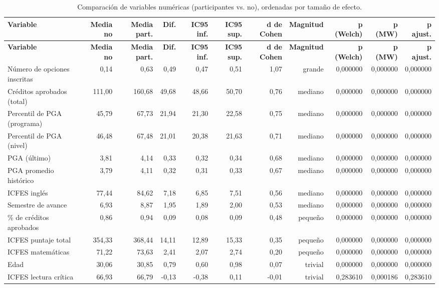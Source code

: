 \begin{longtable}{lrrrrrrrrrr}
\caption{Comparación de variables numéricas (participantes vs. no), ordenadas por tamaño de efecto.}\label{tab:comparativo-num}\\
\toprule
\textbf{Variable} & \textbf{Media no} & \textbf{Media part.} & \textbf{Dif.} & \textbf{IC95 inf.} & \textbf{IC95 sup.} & \textbf{d de Cohen} & \textbf{Magnitud} & \textbf{p (Welch)} & \textbf{p (MW)} & \textbf{p ajust.} \\
\midrule
\endfirsthead
\toprule \textbf{Variable} & \textbf{Media no} & \textbf{Media part.} & \textbf{Dif.} & \textbf{IC95 inf.} & \textbf{IC95 sup.} & \textbf{d de Cohen} & \textbf{Magnitud} & \textbf{p (Welch)} & \textbf{p (MW)} & \textbf{p ajust.} \\
\midrule
\endhead
\bottomrule
\endfoot
Número de opciones inscritas & 0,14 & 0,63 & 0,49 & 0,47 & 0,51 & 1,07 & grande & 0,000000 & 0,000000 & 0,000000 \\
Créditos aprobados (total) & 111,00 & 160,68 & 49,68 & 48,66 & 50,70 & 0,76 & mediano & 0,000000 & 0,000000 & 0,000000 \\
Percentil de PGA (programa) & 45,79 & 67,73 & 21,94 & 21,30 & 22,58 & 0,75 & mediano & 0,000000 & 0,000000 & 0,000000 \\
Percentil de PGA (nivel) & 46,48 & 67,48 & 21,01 & 20,38 & 21,63 & 0,71 & mediano & 0,000000 & 0,000000 & 0,000000 \\
PGA (último) & 3,81 & 4,14 & 0,33 & 0,32 & 0,34 & 0,68 & mediano & 0,000000 & 0,000000 & 0,000000 \\
PGA promedio histórico & 3,79 & 4,11 & 0,32 & 0,31 & 0,33 & 0,67 & mediano & 0,000000 & 0,000000 & 0,000000 \\
ICFES inglés & 77,44 & 84,62 & 7,18 & 6,85 & 7,51 & 0,56 & mediano & 0,000000 & 0,000000 & 0,000000 \\
Semestre de avance & 6,93 & 8,87 & 1,95 & 1,89 & 2,00 & 0,53 & mediano & 0,000000 & 0,000000 & 0,000000 \\
\% de créditos aprobados & 0,86 & 0,94 & 0,09 & 0,08 & 0,09 & 0,48 & pequeño & 0,000000 & 0,000000 & 0,000000 \\
ICFES puntaje total & 354,33 & 368,44 & 14,11 & 12,89 & 15,33 & 0,35 & pequeño & 0,000000 & 0,000000 & 0,000000 \\
ICFES matemáticas & 71,22 & 73,63 & 2,41 & 2,07 & 2,74 & 0,20 & pequeño & 0,000000 & 0,000000 & 0,000000 \\
Edad & 30,06 & 30,85 & 0,79 & 0,60 & 0,98 & 0,07 & trivial & 0,000000 & 0,000000 & 0,000000 \\
ICFES lectura crítica & 66,93 & 66,79 & -0,13 & -0,38 & 0,11 & -0,01 & trivial & 0,283610 & 0,000186 & 0,283610 \\
\end{longtable}